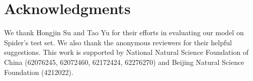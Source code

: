 \documentclass[letterpaper]{article} \usepackage{aaai23}  \usepackage{times}  \usepackage{helvet}  \usepackage{courier}  \usepackage[hyphens]{url}  \usepackage{graphicx} \urlstyle{rm} \def\UrlFont{\rm}  \usepackage{natbib}  \usepackage{caption} \frenchspacing  \setlength{\pdfpagewidth}{8.5in}  \setlength{\pdfpageheight}{11in}  \usepackage{algorithm}
\begin{document}
\section*{Acknowledgments}
We thank Hongjin Su and Tao Yu for their efforts in evaluating our model on Spider's test set. We also thank the anonymous reviewers for their helpful suggestions. This work is supported by National Natural Science Foundation of China (62076245, 62072460, 62172424, 62276270) and Beijing Natural Science Foundation (4212022).


\end{document}
